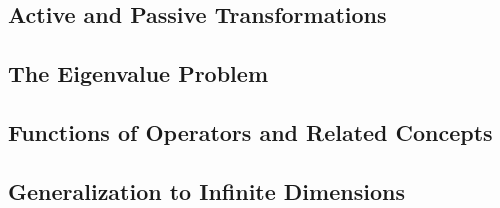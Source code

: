 
\subsection{Active and Passive Transformations}


\subsection{The Eigenvalue Problem}


\subsection{Functions of Operators and Related Concepts}


\subsection{Generalization to Infinite Dimensions}
